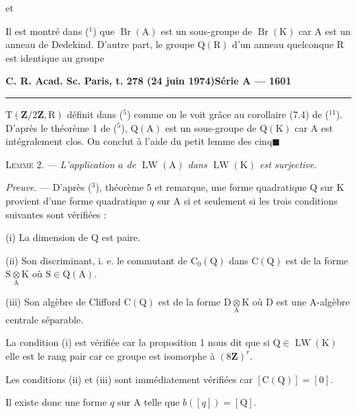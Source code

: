 et


Il est montré dans (${}^1$) que $\operatorname{Br}(\mathrm A)$ est un sous-groupe de $\operatorname{Br}(\mathrm K)$ car A est un anneau de
Dedekind. D'autre part, le groupe $\mathrm Q(\mathrm R)$ d'un anneau quelconque R est identique au groupe

\textbf{C. R. Acad. Sc. Paris, t. 278 (24 juin 1974)}\hfill\textbf{Série A — 1601}

\rule{\linewidth}{0.4pt}

$\mathrm T(\mathbf Z/2\mathbf Z,\mathrm R)$ définit dans (${}^5$) comme on le voit grâce au corollaire (7.4) de (${}^{11}$). D'après
le théorème 1 de (${}^5$), $\mathrm Q(\mathrm A)$ est un sous-groupe de $\mathrm Q(\mathrm K)$ car A est intégralement clos.
On conclut à l'aide du petit lemme des cinq\quad$\blacksquare$

\textsc{Lemme 2}. — \emph{L'application $a$ de $\operatorname{LW}(\mathrm A)$ dans $\operatorname{LW}(\mathrm K)$ est surjective.}

\emph{Preuve}. — D'après (${}^3$), théorème 5 et remarque, une forme quadratique Q sur K provient
d'une forme quadratique $q$ sur A si et seulement si les trois conditions suivantes sont
vérifiées :

(i) La dimension de Q est paire.

(ii) Son discriminant, i. e. le commutant de $\mathrm C_0(\mathrm Q)$ dans $\mathrm C(\mathrm Q)$ est de la forme $\mathrm S\underset{\mathrm A}{\otimes}\mathrm K$
où $\mathrm S\in\mathrm Q(\mathrm A)$.

(iii) Son algèbre de Clifford $\mathrm C(\mathrm Q)$ est de la forme $\mathrm D\underset{\mathrm A}{\otimes}\mathrm K$ où D est une A-algèbre
centrale séparable.

La condition (i) est vérifiée car la proposition 1 nous dit que si $\mathrm Q\in\operatorname{LW}(\mathrm K)$ elle est
le rang pair car ce groupe est isomorphe à $(8\mathbf Z)^r$.

Les conditions (ii) et (iii) sont immédiatement vérifiées car $[\mathrm C(\mathrm Q)]=[0]$.

Il existe donc une forme $q$ sur A telle que $b([q])=[\mathrm Q]$.

